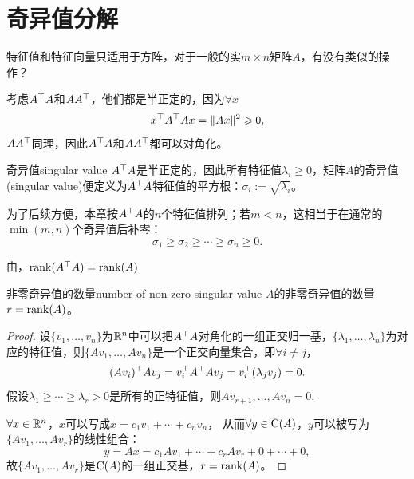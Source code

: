 \chapter{奇异值分解}
特征值和特征向量只适用于方阵，对于一般的实$m \times n$矩阵$A$，有没有类似的操作？

\noindent
考虑$A^\top A$和$AA^\top$，他们都是半正定的，因为$\forall x$
\[
	x^\top A^\top Ax = \lVert Ax\rVert^2 \geqslant 0,
\]
$AA^\top$同理，因此$A^\top A$和$AA^\top$都可以对角化。
\begin{definition}{奇异值}{singular value}
	$A^\top A$是半正定的，因此所有特征值$\lambda_i \geqslant 0$，矩阵$A$的奇异值(singular value)便定义为$A^\top A$特征值的平方根：$\sigma_i := \sqrt{\lambda_i}$。

	为了后续方便，本章按$A^\top A$的$n$个特征值排列；若$m < n$，这相当于在通常的$\min(m,n)$个奇异值后补零：
	\[
		\sigma_1 \geqslant \sigma_2 \geqslant \cdots \geqslant \sigma_n \geqslant 0.
	\]
\end{definition}
由，$\operatorname{rank}(A^\top A) = \operatorname{rank}(A)$
\begin{theorem}{非零奇异值的数量}{number of non-zero singular value}
	$A$的非零奇异值的数量$r = \operatorname{rank}(A)$。
\end{theorem}
\begin{proof}
	设$\{v_1,\ldots,v_n\}$为$\mathbb{R}^n$中可以把$A^\top A$对角化的一组正交归一基，$\{\lambda_1,\ldots,\lambda_n\}$为对应的特征值，则$\{Av_1,\ldots,Av_n\}$是一个正交向量集合，即$\forall i \neq j$，
	\[
		(Av_i)^\top Av_j = v_i^\top A^\top Av_j = v_i^\top(\lambda_jv_j) = 0.
	\]
	假设$\lambda_1 \geqslant \cdots \geqslant \lambda_r > 0$是所有的正特征值，则$Av_{r+1},\ldots,Av_n = 0$.
	
	$\forall x \in \mathbb{R}^n$，$x$可以写成$x = c_1v_1 + \cdots + c_nv_n$，
	从而$\forall y \in \operatorname{C}(A)$，$y$可以被写为$\{Av_1,\ldots,Av_r\}$的线性组合：
	\[
		y = Ax = c_1Av_1 + \cdots + c_rAv_r + 0 + \cdots + 0,
	\]
	故$\{Av_1,\ldots,Av_r\}$是$\operatorname{C}(A)$的一组正交基，$r = \operatorname{rank}(A)$。
\end{proof}
